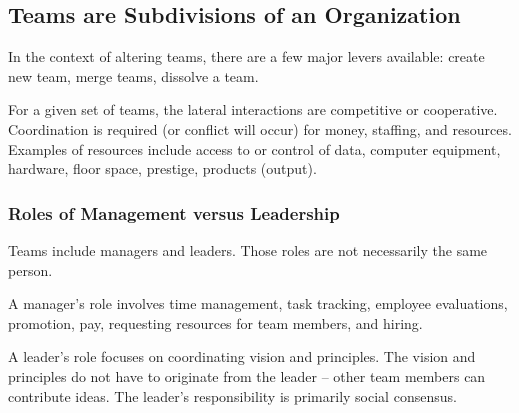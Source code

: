 

\subsection{Teams are Subdivisions of an Organization}

\cite{2015_Katzenbach}

In the context of altering teams, there are a few major levers available: create new team, merge teams, dissolve a team. 


For a given set of teams, the lateral interactions are competitive or cooperative. Coordination is required (or conflict will occur) for money, staffing, and resources. Examples of resources include access to or control of data, computer equipment, hardware, floor space, prestige, products (output).

\subsubsection{Roles of Management versus Leadership}

Teams include managers and leaders. Those roles are not necessarily the same person. 

A manager's role involves time management, task tracking, employee evaluations, promotion, pay, requesting resources for team members, and hiring. 

A leader's role focuses on coordinating vision and principles. The vision and principles do not have to originate from the leader -- other team members can contribute ideas. The leader's responsibility is primarily social consensus. 